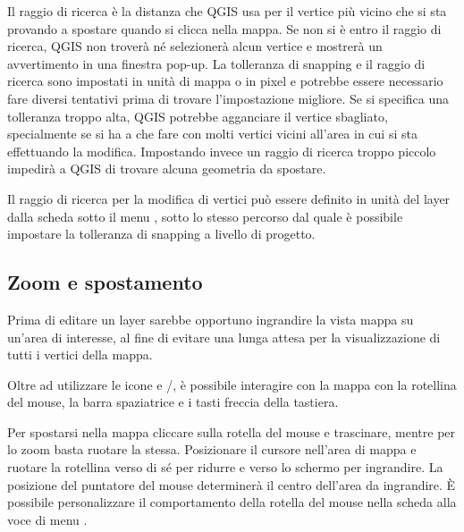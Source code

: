 
Il raggio di ricerca è la distanza che QGIS usa per  il 
vertice più vicino che si sta provando a spostare quando si clicca nella mappa.
Se non si è entro il raggio di ricerca, QGIS non troverà né selezionerà alcun vertice 
e mostrerà un avvertimento in una finestra pop-up.
La tolleranza di snapping e il raggio di ricerca sono impostati in unità di
mappa o in pixel e potrebbe essere necessario fare diversi tentativi prima di trovare
l'impostazione migliore. Se si specifica una tolleranza troppo alta, QGIS
potrebbe agganciare il vertice sbagliato, specialmente se si ha a che fare con
molti vertici vicini all'area in cui si sta effettuando la modifica.
Impostando invece un raggio di ricerca troppo piccolo impedirà a QGIS
di trovare alcuna geometria da spostare.

Il raggio di ricerca per la modifica di vertici può essere definito in unità
del layer dalla scheda  sotto il menu
 \arrow {}, sotto lo
stesso percorso dal quale è possibile impostare la tolleranza di snapping a
livello di progetto.

\subsection{Zoom e spostamento}

Prima di editare un layer sarebbe opportuno ingrandire la vista mappa su un'area 
di interesse, al fine di evitare una lunga attesa per la visualizzazione di tutti 
i vertici della mappa. 

Oltre ad utilizzare le icone  e
/, 
è possibile interagire con la mappa con la rotellina del mouse, la barra spaziatrice
e i tasti freccia della tastiera.


Per spostarsi nella mappa cliccare sulla rotella del mouse e trascinare, mentre 
per lo zoom basta ruotare la stessa. Posizionare il cursore nell'area di mappa e 
ruotare la rotellina verso di sé per ridurre e verso lo schermo per ingrandire. La
posizione del puntatore del mouse determinerà il centro dell'area da ingrandire. 
È possibile personalizzare il comportamento della rotella del mouse nella scheda 
 alla voce di menu  \arrow {}.

